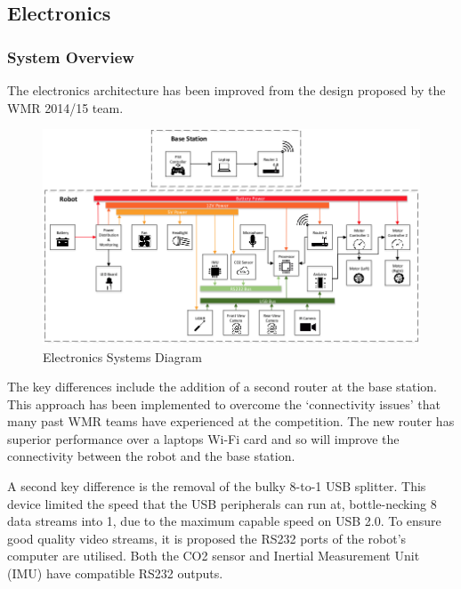 
\subsection{Electronics}

\subsubsection{System Overview}
The electronics architecture has been improved from the design proposed by the WMR 2014/15 team.\par

\begin{figure}[ht]
\centering\includegraphics[width=0.8\linewidth]
{Images/ElectronicsFigures/ElectronicsBlockDiagram.png}
\caption{Electronics Systems Diagram}
\label{fig:eleoverview}
\end{figure}

The key differences include the addition of a second router at the base station. This approach has been implemented to overcome the ‘connectivity issues’ that many past WMR teams have experienced at the competition. The new router has superior performance over a laptops Wi-Fi card and so will improve the connectivity between the robot and the base station.\par

A second key difference is the removal of the bulky 8-to-1 USB splitter. This device limited the speed that the USB peripherals can run at, bottle-necking 8 data streams into 1, due to the maximum capable speed on USB 2.0. To ensure good quality video streams, it is proposed the RS232 ports of the robot's computer are utilised. Both the CO2 sensor and Inertial Measurement Unit (IMU) have compatible RS232 outputs.\par

